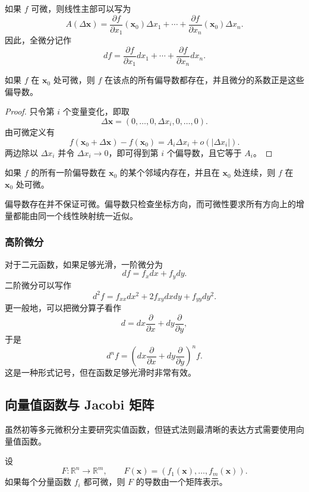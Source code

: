 如果 $f$ 可微，则线性主部可以写为
\[
    A(\Delta\mathbf{x})
    =\frac{\partial f}{\partial x_1}(\mathbf{x}_0)\Delta x_1+\cdots+
    \frac{\partial f}{\partial x_n}(\mathbf{x}_0)\Delta x_n.
\]
因此，全微分记作
\[
    df=\frac{\partial f}{\partial x_1}dx_1+\cdots+
    \frac{\partial f}{\partial x_n}dx_n.
\]

\begin{theorem}[可微的必要条件]
如果 $f$ 在 $\mathbf{x}_0$ 处可微，则 $f$ 在该点的所有偏导数都存在，并且微分的系数正是这些偏导数。
\end{theorem}

\begin{proof}
只令第 $i$ 个变量变化，即取
\[
    \Delta\mathbf{x}=(0,\dots,0,\Delta x_i,0,\dots,0).
\]
由可微定义有
\[
    f(\mathbf{x}_0+\Delta\mathbf{x})-f(\mathbf{x}_0)=A_i\Delta x_i+o(|\Delta x_i|).
\]
两边除以 $\Delta x_i$ 并令 $\Delta x_i\to0$，即可得到第 $i$ 个偏导数，且它等于 $A_i$。
\end{proof}

\begin{theorem}[可微的充分条件]
如果 $f$ 的所有一阶偏导数在 $\mathbf{x}_0$ 的某个邻域内存在，并且在 $\mathbf{x}_0$ 处连续，则 $f$ 在 $\mathbf{x}_0$ 处可微。
\end{theorem}

\begin{remark}
偏导数存在并不保证可微。偏导数只检查坐标方向，而可微性要求所有方向上的增量都能由同一个线性映射统一近似。
\end{remark}

\subsubsection{高阶微分}

对于二元函数，如果足够光滑，一阶微分为
\[
    df=f_xdx+f_ydy.
\]
二阶微分可以写作
\[
    d^2f=f_{xx}dx^2+2f_{xy}dxdy+f_{yy}dy^2.
\]
更一般地，可以把微分算子看作
\[
    d=dx\frac{\partial}{\partial x}+dy\frac{\partial}{\partial y},
\]
于是
\[
    d^nf=\left(dx\frac{\partial}{\partial x}+dy\frac{\partial}{\partial y}\right)^nf.
\]
这是一种形式记号，但在函数足够光滑时非常有效。

\subsection{向量值函数与 Jacobi 矩阵}

虽然初等多元微积分主要研究实值函数，但链式法则最清晰的表达方式需要使用向量值函数。

设
\[
    F:\mathbb{R}^n\to\mathbb{R}^m,
    \qquad
    F(\mathbf{x})=(f_1(\mathbf{x}),\dots,f_m(\mathbf{x})).
\]
如果每个分量函数 $f_i$ 都可微，则 $F$ 的导数由一个矩阵表示。

